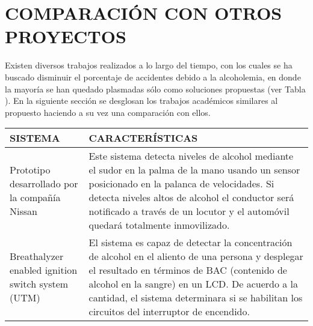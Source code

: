 \section{COMPARACIÓN CON OTROS PROYECTOS}
Existen diversos trabajos realizados a lo largo del tiempo, con los cuales se ha buscado disminuir el porcentaje de accidentes debido a la alcoholemia, en donde la mayoría se han quedado plasmadas sólo como soluciones propuestas (ver Tabla ). En la siguiente sección se desglosan los trabajos académicos similares al propuesto haciendo a su vez una comparación con ellos.
\begin{table}[ht]
    \noindent \centering \resizebox{\textwidth}{!}
    {        
        \begin{tabular}{|p{3cm}|p{7cm}|}
            \hline
                SISTEMA & CARACTERÍSTICAS \\
            \hline
                Prototipo desarrollado por la compañía Nissan & Este sistema detecta niveles de alcohol mediante el sudor en la palma de la mano usando un sensor posicionado en la palanca de velocidades. Si detecta niveles altos de alcohol el conductor será notificado a través de un locutor y el automóvil quedará totalmente inmovilizado. \\
            \hline
                Breathalyzer enabled ignition switch system (UTM)& El sistema es capaz de detectar la concentración de alcohol en el aliento de una persona y desplegar el resultado en términos de BAC (contenido de alcohol en la sangre) en un LCD. De acuerdo a la cantidad, el sistema determinara si se habilitan los circuitos del interruptor de encendido.  \\
            \hline
        \end{tabular}
    }
     \label{tab:sintomas_niveles} 
\end{table}